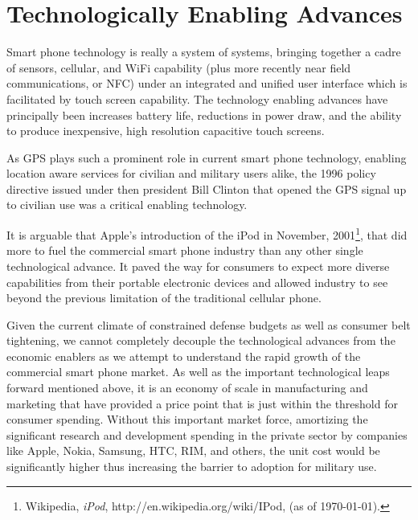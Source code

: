 \documentclass[letterpaper,12pt]{article}
\begin{document}
\section*{Technologically Enabling Advances}
Smart phone technology is really a system of systems, bringing together a cadre of sensors, cellular, and WiFi capability (plus more recently near field communications, or NFC) under an integrated and unified user interface which is facilitated by touch screen capability.  The technology enabling advances have principally been increases battery life, reductions in power draw, and the ability to produce inexpensive, high resolution capacitive touch screens.

As GPS plays such a prominent role in current smart phone technology, enabling location aware services for civilian and military users alike, the 1996 policy directive issued under then president Bill Clinton that opened the GPS signal up to civilian use was a critical enabling technology.

It is arguable that Apple's introduction of the iPod in November, 2001\footnote{Wikipedia, \emph{iPod}, http://en.wikipedia.org/wiki/IPod, (as of \today).}, that did more to fuel the commercial smart phone industry than any other single technological advance.  It paved the way for consumers to expect more diverse capabilities from their portable electronic devices and allowed industry to see beyond the previous limitation of the traditional cellular phone.

Given the current climate of constrained defense budgets as well as consumer belt tightening, we cannot completely decouple the technological advances from the economic enablers as we attempt to understand the rapid growth of the commercial smart phone market.  As well as the important technological leaps forward mentioned above, it is an economy of scale in manufacturing and marketing that have provided a price point that is just within the threshold for consumer spending.  Without this important market force, amortizing the significant research and development spending in the private sector by companies like Apple, Nokia, Samsung, HTC, RIM, and others, the unit cost would be significantly higher thus increasing the barrier to adoption for military use.
\end{document}
